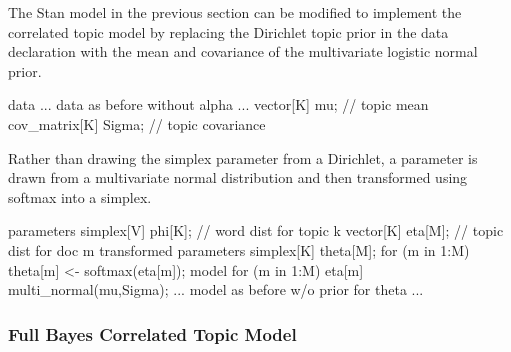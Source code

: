 The Stan model in the previous section can be modified to implement
the correlated topic model by replacing the Dirichlet topic prior
 in the data declaration with the mean and covariance of
the multivariate logistic normal prior.
%
\begin{stancode}
data {
  ... data as before without alpha ...
  vector[K] mu;          // topic mean
  cov_matrix[K] Sigma;   // topic covariance 
}
\end{stancode}
%
Rather than drawing the simplex parameter  from a
Dirichlet, a parameter  is drawn from a multivariate normal
distribution and then transformed using softmax into a simplex.
%
\begin{stancode}
parameters {
  simplex[V] phi[K];  // word dist for topic k
  vector[K] eta[M];   // topic dist for doc m
}
transformed parameters {
  simplex[K] theta[M];
  for (m in 1:M)
    theta[m] <- softmax(eta[m]);
}
model {
  for (m in 1:M)
    eta[m] ~ multi_normal(mu,Sigma);
  ... model as before w/o prior for theta ...
}
\end{stancode}

\subsubsection{Full Bayes Correlated Topic Model}

